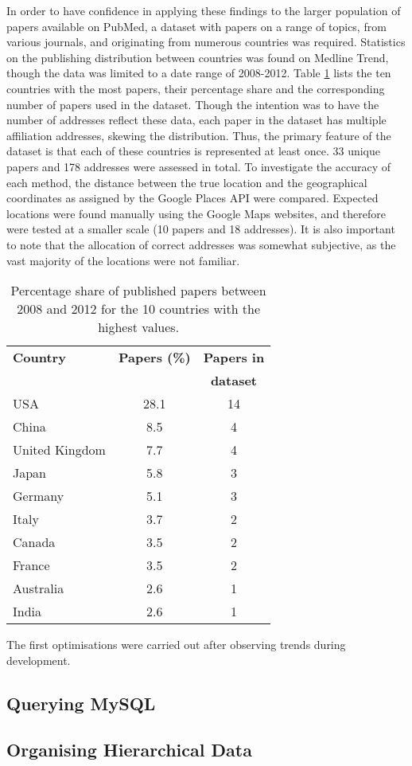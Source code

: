 \documentclass[Report.tex]{subfiles}
\begin{document}
\noindent In order to have confidence in applying these findings to the larger population of papers available on PubMed, a dataset with papers on a range of topics, from various journals, and originating from numerous countries was required. Statistics on the publishing distribution between countries was found on Medline Trend\cite{medlinetrend}, though the data was limited to a date range of 2008-2012. Table \ref{tab:countries} lists the ten countries with the most papers, their percentage share and the corresponding number of papers used in the dataset. Though the intention was to have the number of addresses reflect these data, each paper in the dataset has multiple affiliation addresses, skewing the distribution. Thus, the primary feature of the dataset is that each of these countries is represented at least once. 33 unique papers and 178 addresses were assessed in total. To investigate the accuracy of each method, the distance between the true location and the geographical coordinates as assigned by the Google Places API were compared. Expected locations were found manually using the Google Maps websites, and therefore were tested at a smaller scale (10 papers and 18 addresses). It is also important to note that the allocation of correct addresses was somewhat subjective, as the vast majority of the locations were not familiar. \newline

\begin{table}
\begin{center}
    \begin{tabular}{ | l | c | c | }\hline
    \textbf{Country} & \textbf{Papers (\%)} & \textbf{Papers in} \\
     & &\textbf{dataset}\\ \hline
    USA & 28.1 & 14\\ \hline
    China & 8.5 & 4\\ \hline
    United Kingdom & 7.7 & 4\\ \hline
    Japan & 5.8 & 3\\ \hline
    Germany & 5.1 & 3\\ \hline
    Italy & 3.7 & 2\\ \hline
    Canada & 3.5 & 2\\ \hline
    France & 3.5 & 2\\ \hline
    Australia & 2.6 & 1\\ \hline
    India & 2.6 & 1\\ \hline
    \end{tabular}
    \label{tab:countries}
    \caption{Percentage share of published papers between 2008 and 2012 for the 10 countries with the highest values.}
\end{center}
\end{table}\newline

\noindent The first optimisations were carried out after observing trends during development.

\subsection{Querying MySQL}
\subsection{Organising Hierarchical Data}
\end{document}
